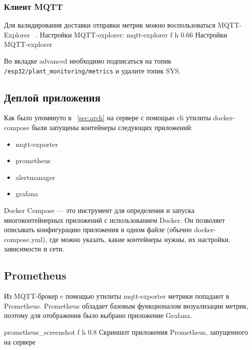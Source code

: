 \documentclass{bmstu}
\begin{document}
    \subsubsection{Клиент MQTT}
    Для валидирования доставки отправки метрик можно воспользоваться MQTT-Explorer ~\cite{nordquistMQTTExplorer}.
    Настройки MQTT-explorer:
        {mqtt-explorer} %
        {f} %
        {h} %
        {0.66\textwidth} %
        {Настройки MQTT-explorer} %

    Во вкладке advanced необходимо подписаться на топик \texttt{/esp32/plant\_monitoring/metrics} и удалите топик SYS.

    \subsection{Деплой приложения}

    Как было упомянуто в ~\ref{sec:arch} на сервере с помощью cli утилиты docker-compose были запущены контейнеры следующих приложений:
    \begin{itemize}
        \item mqtt-exporter
        \item prometheus
        \item alertmanager
        \item grafana
    \end{itemize}

    Docker Compose — это инструмент для определения и запуска многоконтейнерных приложений с использованием Docker.
    Он позволяет описывать конфигурацию приложения в одном файле (обычно docker-compose.yml), где можно указать,
    какие контейнеры нужны, их настройки, зависимости и сети.

    \subsection{Prometheus}
    Из MQTT-брокер c помощью утилиты mqtt-exporter метрики попадают в Prometheus.
    Prometheus обладает базовым функционалом визуализации метрик, поэтому для отображения было выбрано приложение Grafana.

        {prometheus_screenshot}
        {f}
        {h}
        {0.8\textwidth}
        {Скриншот приложения Prometheus, запущенного на сервере}
\end{document}

